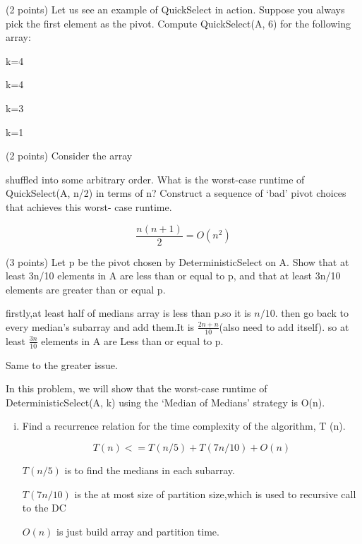 \documentclass[11pt]{article}
\begin{document}
\begin{subparts}
    \item (2 points) Let us see an example of QuickSelect in action. Suppose you always pick
    the first element as the pivot. Compute QuickSelect(A, 6) for the following array: \par
    \begin{solution}
        [78,13,97,45,48,26,85,100,78] k=4 \par
        [13,45,48,26] k=4 \par
        [45,48,26] k=3 \par
        [48] k=1 \par
    \end{solution}

    \item (2 points) Consider the array \par
    shuffled into some arbitrary order. What is the worst-case runtime of QuickSelect(A,
n/2) in terms of n? Construct a sequence of ‘bad’ pivot choices that achieves this worst-
case runtime. \par
    \begin{solution}
        $$\frac{n(n+1)}{2}=O(n^2)$$
    \end{solution}

    \item (3 points) Let p be the pivot chosen by DeterministicSelect on A. Show that at
    least 3n/10 elements in A are less than or equal to p, and that at least 3n/10 elements
    are greater than or equal p. \par
    \begin{solution}
        firstly,at least half of medians array is less than p.so it is $n/10$.
        then go back to every median's subarray and add them.It is $\frac{2n+n}{10}$(also need to add itself).
        so at least $\frac{3n}{10}$ elements in A are Less than or equal to p. \par
        Same to the greater issue.
    \end{solution}

    \item In this problem, we will show that the worst-case runtime of DeterministicSelect(A,
    k) using the ‘Median of Medians’ strategy is O(n). \par
    \begin{enumerate}[i.]
        \item Find a recurrence relation for the time complexity of the algorithm, T (n). \par
        \begin{solution}
            $$T(n)<=T(n/5)+T(7n/10)+O(n)$$ \par
            $T(n/5)$ is to find the medians in each subarray.\par
            $T(7n/10)$ is the at most size of partition size,which is used to recursive call to the DC \par
            $O(n)$ is just build array and partition time.
        \end{solution}


\end{enumerate}
\end{subparts}
\end{document}
